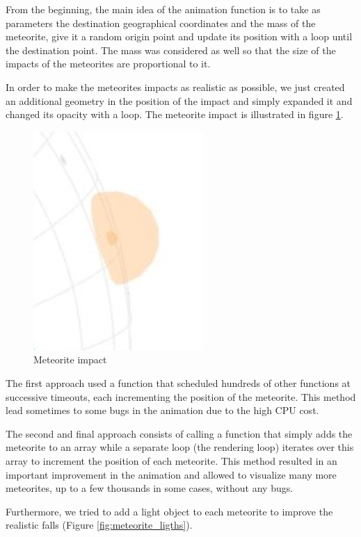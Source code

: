 \documentclass[10pt,conference,compsocconf]{IEEEtran}
\begin{document}
From the beginning, the main idea of the animation function is to take as parameters the destination geographical coordinates and the mass of the meteorite, give it a random origin point and update its position with a loop until the destination point. 
The mass was considered as well so that the size of the impacts of the meteorites are proportional to it. 

In order to make the meteorites impacts as realistic as possible, we just created an additional geometry in the position of the impact and simply expanded it and changed its opacity with a loop. The meteorite impact is illustrated in figure \ref{fig:meteorite_impact}. 

\begin{figure}[H]
  \centering
  \includegraphics[width=.5\columnwidth]{images/meteorite_impact}
  \vspace{-3mm}
  \caption{Meteorite impact}
  \label{fig:meteorite_impact}
\end{figure}

The first approach used a function that scheduled hundreds of other functions at successive timeouts, each incrementing the position of the meteorite. This method lead sometimes to some bugs in the animation due to the high CPU cost.

The second and final approach consists of calling a function that simply adds the meteorite to an array while a separate loop (the rendering loop) iterates over this array to increment the position of each meteorite.
This method resulted in an important improvement in the animation and allowed to visualize many more meteorites, up to a few thousands in some cases, without any bugs.

Furthermore, we tried to add a light object to each meteorite to improve the realistic falls (Figure \ref{fig:meteorite_ligths}).
\end{document}
